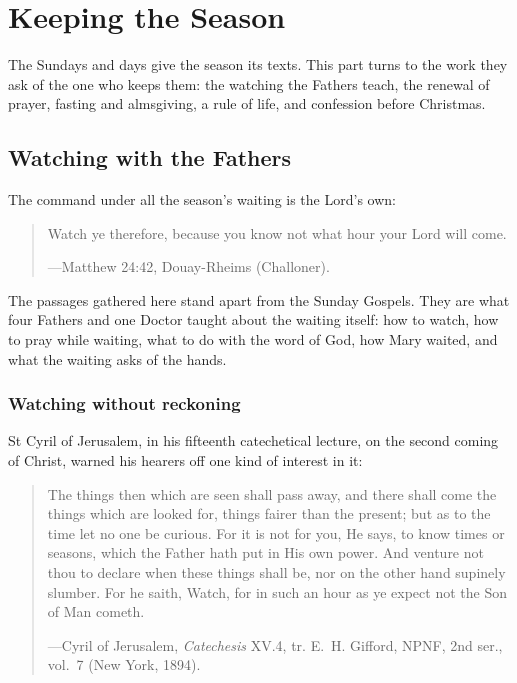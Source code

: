 \section{Keeping the Season}

The Sundays and days give the season its texts. This part turns to the work they ask of the one
who keeps them: the watching the Fathers teach, the renewal of prayer, fasting and almsgiving,
a rule of life, and confession before Christmas.

\subsection{Watching with the Fathers}\label{sec:fathers}

The command under all the season's waiting is the Lord's own:

\begin{quote}
Watch ye therefore, because you know not what hour your Lord will come.\par
{\smallskip\noindent\small ---Matthew 24:42, Douay-Rheims (Challoner).\par}
\end{quote}

\noindent The passages gathered here stand apart from the Sunday Gospels. They
are what four Fathers and one Doctor taught about the waiting itself: how to watch, how to pray
while waiting, what to do with the word of God, how Mary waited, and what the waiting asks of the
hands.

\subsubsection{Watching without reckoning}

St Cyril of Jerusalem, in his fifteenth catechetical lecture, on the second coming of Christ,
warned his hearers off one kind of interest in it:

\begin{quote}
The things then which are seen shall pass away, and there shall come the things which are looked
for, things fairer than the present; but as to the time let no one be curious. For it is not for
you, He says, to know times or seasons, which the Father hath put in His own power. And venture
not thou to declare when these things shall be, nor on the other hand supinely slumber. For he
saith, Watch, for in such an hour as ye expect not the Son of Man cometh.\par
{\smallskip\noindent\small ---Cyril of Jerusalem, \textit{Catechesis} XV.4, tr. E.~H. Gifford,
NPNF, 2nd ser., vol.~7 (New York, 1894).\par}
\end{quote}

